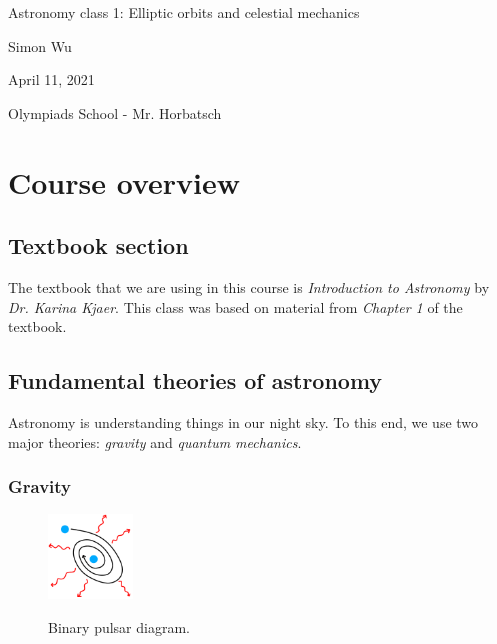 \documentclass[12pt]{article}
\begin{document}
\begin{titlepage}

\begin{center}
    \Huge{Astronomy class 1: Elliptic orbits and celestial mechanics}
    
    \vspace{1in}
    
    \Large{Simon Wu}
    
    \Large{April 11, 2021}
    
    \vspace{1in}
    
    \Large{Olympiads School - Mr. Horbatsch}

    
\end{center}

\tableofcontents

\end{titlepage}

\section{Course overview}

\subsection{Textbook section}

The textbook that we are using in this course is \emph{Introduction to Astronomy} by \emph{Dr. Karina Kjaer}.
This class was based on material from \emph{Chapter 1} of the textbook.

\subsection{Fundamental theories of astronomy}

Astronomy is understanding things in our night sky.
To this end, we use two major theories: \emph{gravity} and \emph{quantum mechanics}.

\subsubsection{Gravity}

\begin{figure}
    \centering
    \includegraphics[width=0.2\textwidth]{binary_pulsar}
    \label{fig:binarypulsar}
    \caption{Binary pulsar diagram.}
\end{figure}
\end{document}
